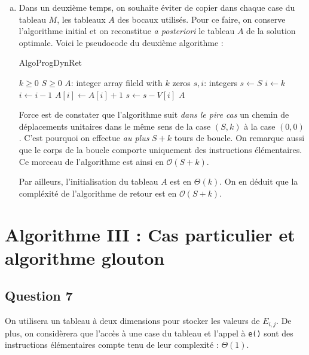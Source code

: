 \documentclass[12pt,a4paper]{article}
\newcommand{\BigO}{\mathcal{O}}
\begin{document}
\begin{enumerate}[a)]
 \item Dans un deuxi\`eme temps, on souhaite \'eviter de copier dans chaque case du tableau $M$, les tableaux $A$ des bocaux utilis\'es. Pour ce faire, on conserve l'algorithme initial et on reconstitue {\itshape a posteriori} le tableau $A$ de la solution optimale. Voici le pseudocode du deuxi\`eme algorithme :
 \begin{algorithm}
\caption{AlgoProgDynRet}
\begin{algorithmic}[1]
\Require $k \geq 0$ \AND $S \geq 0$
    \State $A$: integer array fileld with $k$ zeros
    \State $s, i$: integers
    \State $s \gets S$
    \State $i \gets k$
            \State $i \gets i-1$
        \Else
            \State $A[i] \gets A[i] + 1$
            \State $s \gets s - V[i]$
        \EndIf
    \EndWhile
    \State \Return $A$
\EndFunction
\end{algorithmic}
\end{algorithm}

 
 Force est de constater que l'algorithme suit {\itshape dans le pire cas} un chemin de d\'eplacements unitaires dans le m\^eme sens de la case $(S,k)$ \`a la case $(0,0)$. C'est pourquoi on effectue {\itshape au plus} $S+k$ tours de boucle. On remarque aussi que le corps de la boucle comporte uniquement des instructions \'el\'ementaires. Ce morceau de l'algorithme est ainsi en $\BigO(S+k)$.
 
 Par ailleurs, l'initialisation du tableau $A$ est en $\Theta(k)$. On en d\'eduit que la compl\'exit\'e de l'algorithme de retour est en $\BigO(S+k)$. 
\end{enumerate}

\section{Algorithme III : Cas particulier et algorithme glouton}

\subsection*{Question 7}
On utilisera un tableau \`a deux dimensions pour stocker les valeurs de \( E_{i,j} \). De plus, on consid\`erera que l'acc\`es \`a une case du tableau et l'appel \`a \texttt{e()} sont des instructions \'el\'ementaires  compte tenu de leur complexit\'e : $\Theta(1)$. 
\end{document}
